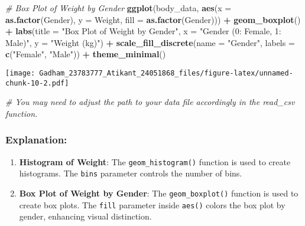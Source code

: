 \documentclass[
]{article}
\newenvironment{Shaded}{\begin{snugshade}}{\end{snugshade}}
\newcommand{\AttributeTok}[1]{\textcolor[rgb]{0.13,0.29,0.53}{#1}}
\newcommand{\CommentTok}[1]{\textcolor[rgb]{0.56,0.35,0.01}{\textit{#1}}}
\newcommand{\FunctionTok}[1]{\textcolor[rgb]{0.13,0.29,0.53}{\textbf{#1}}}
\newcommand{\NormalTok}[1]{#1}
\newcommand{\SpecialCharTok}[1]{\textcolor[rgb]{0.81,0.36,0.00}{\textbf{#1}}}
\newcommand{\StringTok}[1]{\textcolor[rgb]{0.31,0.60,0.02}{#1}}
\providecommand{\tightlist}{%
  \setlength{\itemsep}{0pt}\setlength{\parskip}{0pt}}
\begin{document}
\begin{Shaded}
\begin{Highlighting}[]
\CommentTok{\# Box Plot of Weight by Gender}
\FunctionTok{ggplot}\NormalTok{(body\_data, }\FunctionTok{aes}\NormalTok{(}\AttributeTok{x =} \FunctionTok{as.factor}\NormalTok{(Gender), }\AttributeTok{y =}\NormalTok{ Weight, }\AttributeTok{fill =} \FunctionTok{as.factor}\NormalTok{(Gender))) }\SpecialCharTok{+}
  \FunctionTok{geom\_boxplot}\NormalTok{() }\SpecialCharTok{+}
  \FunctionTok{labs}\NormalTok{(}\AttributeTok{title =} \StringTok{"Box Plot of Weight by Gender"}\NormalTok{, }\AttributeTok{x =} \StringTok{"Gender (0: Female, 1: Male)"}\NormalTok{, }\AttributeTok{y =} \StringTok{"Weight (kg)"}\NormalTok{) }\SpecialCharTok{+}
  \FunctionTok{scale\_fill\_discrete}\NormalTok{(}\AttributeTok{name =} \StringTok{"Gender"}\NormalTok{, }\AttributeTok{labels =} \FunctionTok{c}\NormalTok{(}\StringTok{"Female"}\NormalTok{, }\StringTok{"Male"}\NormalTok{)) }\SpecialCharTok{+}
  \FunctionTok{theme\_minimal}\NormalTok{()}
\end{Highlighting}
\end{Shaded}

\texttt{[image: Gadham\_23783777\_Atikant\_24051868\_files/figure-latex/unnamed-chunk-10-2.pdf]}

\begin{Shaded}
\begin{Highlighting}[]
\CommentTok{\# You may need to adjust the path to your data file accordingly in the read\_csv function.}
\end{Highlighting}
\end{Shaded}

\hypertarget{explanation}{%
\subsubsection{Explanation:}\label{explanation}}

\begin{enumerate}
\def\labelenumi{\arabic{enumi}.}
\tightlist
\item
  \textbf{Histogram of Weight}: The \texttt{geom\_histogram()} function
  is used to create histograms. The \texttt{bins} parameter controls the
  number of bins.
\item
  \textbf{Box Plot of Weight by Gender}: The \texttt{geom\_boxplot()}
  function is used to create box plots. The \texttt{fill} parameter
  inside \texttt{aes()} colors the box plot by gender, enhancing visual
  distinction.
\end{enumerate}
\end{document}
